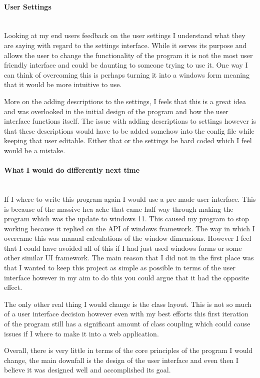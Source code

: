 \begin{flushleft}
    \paragraph{User Settings} \mbox{}\\
    Looking at my end users feedback on the user settings I understand what they are saying with regard to the settings interface. While it serves its purpose and allows the user to change the functionality of the program it is not the most user friendly interface and could be daunting to someone trying to use it. One way I can think of overcoming this is perhaps turning it into a windows form meaning that it would be more intuitive to use. \\ \bk

    More on the adding descriptions to the settings, I feels that this is a great idea and was overlooked in the initial design of the program and how the user interface functions itself. The issue with adding descriptions to settings however is that these descriptions would have to be added somehow into the config file while keeping that user editable. Either that or the settings be hard coded which I feel would be a mistake.\\ \bk    
    
    \paragraph{What I would do differently next time} \mbox{} \\
    If I where to write this program again I would use a pre made user interface. This is because of the massive hea ache that came half way through making the program which was the update to windows 11. This caused my program to stop working because it replied on the API of windows framework. The way in which I overcame this was manual calculations of the window dimensions. However I feel that I could have avoided all of this if I had just used windows forms or some other similar UI framework. The main reason that I did not in the first place was that I wanted to keep this project as simple as possible in terms of the user interface however in my aim to do this you could argue that it had the opposite effect. \\ \bk

    The only other real thing I would change is the class layout. This is not so much of a user interface decision however even with my best efforts this first iteration of the program still has a significant amount of class coupling which could cause issues if I where to make it into a web application. \\ \bk

    Overall, there is very little in terms of the core principles of the program I would change, the main downfall is the design of the user interface and even then I believe it was designed well and accomplished its goal.
    
    \BK


\end{flushleft}